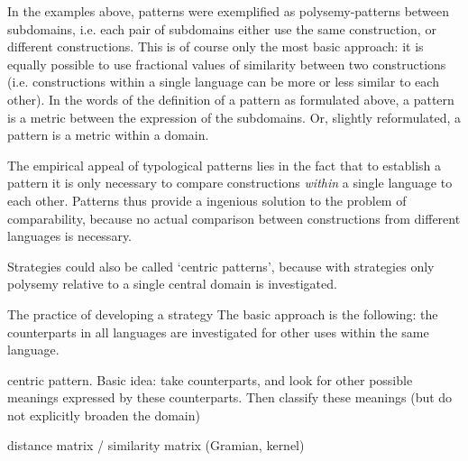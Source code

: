 In the examples above, patterns were exemplified as polysemy-patterns between subdomains, i.e. each pair of subdomains either use the same construction, or different constructions. This is of course only the most basic approach: it is equally possible to use fractional values of similarity between two constructions (i.e. constructions within a single language can be more or less similar to each other). In the words of the definition of a pattern as formulated above, a pattern is a metric between the expression of the subdomains. Or, slightly reformulated, a pattern is a metric within a domain.

The empirical appeal of typological patterns lies in the fact that to establish a pattern it is only necessary to compare constructions \emph{within} a single language to each other. Patterns thus provide a ingenious solution to the problem of comparability, because no actual comparison between constructions from different languages is necessary.

%
Strategies could also be called `centric patterns', because with strategies only polysemy relative to a single central domain is investigated. 

The practice of developing a strategy
The basic approach is the following: the counterparts in all languages are investigated for other uses within the same language.

centric pattern. Basic idea: take counterparts, and look for other possible meanings expressed by these counterparts. Then classify these meanings (but do not explicitly broaden the domain)




distance matrix / similarity matrix
(Gramian, kernel)

